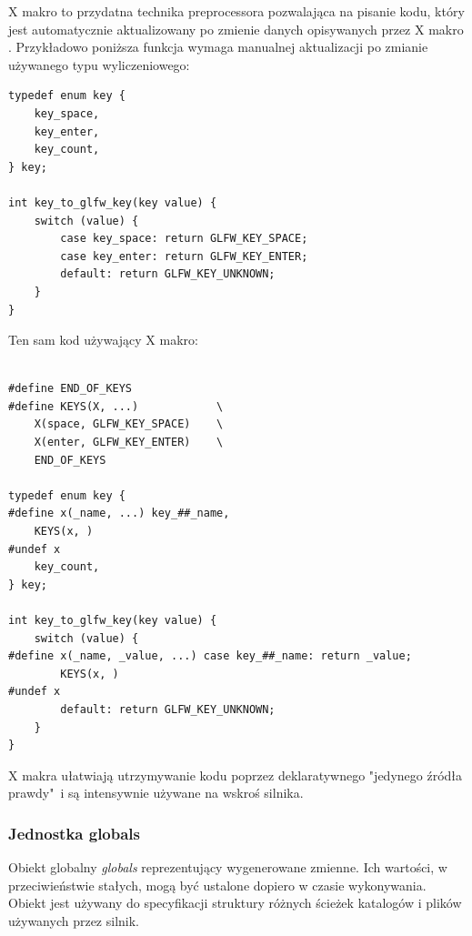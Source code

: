 X makro to przydatna technika preprocessora pozwalająca na pisanie kodu, który jest automatycznie aktualizowany po zmienie danych opisywanych przez X makro \cite{XMACRO}.
Przykładowo poniższa funkcja wymaga manualnej aktualizacji po zmianie używanego typu wyliczeniowego:
\lstset{language=C}
\begin{lstlisting}[caption={Przykładowy kod przed zastosowaniem X makro},captionpos=b]
typedef enum key {
	key_space,
	key_enter,
	key_count,
} key;

int key_to_glfw_key(key value) {
	switch (value) {
		case key_space: return GLFW_KEY_SPACE;
		case key_enter: return GLFW_KEY_ENTER;
		default: return GLFW_KEY_UNKNOWN;
	}
}
\end{lstlisting}
Ten sam kod używający X makro:
\lstset{language=C}
\begin{lstlisting}[caption={Przykładowy kod po zastosowaniu X makro},captionpos=b]

#define END_OF_KEYS
#define KEYS(X, ...)			\
	X(space, GLFW_KEY_SPACE)	\
	X(enter, GLFW_KEY_ENTER)	\
	END_OF_KEYS

typedef enum key {
#define x(_name, ...) key_##_name,
	KEYS(x, )
#undef x
	key_count,
} key;

int key_to_glfw_key(key value) {
	switch (value) {
#define x(_name, _value, ...) case key_##_name: return _value;
		KEYS(x, )
#undef x
		default: return GLFW_KEY_UNKNOWN;
	}
}
\end{lstlisting}
X makra ułatwiają utrzymywanie kodu poprzez deklaratywnego "jedynego źródła prawdy"\  i są intensywnie używane na wskroś silnika.

\subsubsection{Jednostka globals}
Obiekt globalny \textit{globals} reprezentujący wygenerowane zmienne.
Ich wartości, w przeciwieństwie stałych, mogą być ustalone dopiero w czasie wykonywania.
Obiekt jest używany do specyfikacji struktury różnych ścieżek katalogów i plików używanych przez silnik.

